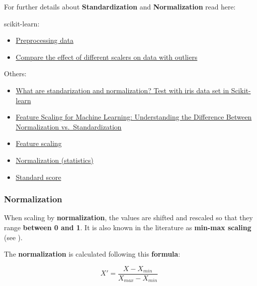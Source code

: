 \documentclass [oneside,10pt,a4paper,ngerman,BCOR10mm,headsepline,parindent,final]{scrartcl}
\providecommand{\tightlist}{%
      \setlength{\itemsep}{0pt}\setlength{\parskip}{0pt}}
\begin{document}
For further details about \textbf{Standardization} and
\textbf{Normalization} read here:

scikit-learn:

\begin{itemize}
\tightlist
\item
  \href{https://scikit-learn.org/stable/modules/preprocessing.html}{Preprocessing
  data}
\item
  \href{https://scikit-learn.org/stable/auto_examples/preprocessing/plot_all_scaling.html\#sphx-glr-auto-examples-preprocessing-plot-all-scaling-py}{Compare
  the effect of different scalers on data with outliers}
\end{itemize}

Others:

\begin{itemize}
\tightlist
\item
  \href{http://techflare.blog/what-are-standarization-and-normalization-test-with-iris-data-set-in-scikit-learn/}{What
  are standarization and normalization? Test with iris data set in
  Scikit-learn}
\item
  \href{https://www.analyticsvidhya.com/blog/2020/04/feature-scaling-machine-learning-normalization-standardization/?}{Feature
  Scaling for Machine Learning: Understanding the Difference Between
  Normalization vs.~Standardization}
\item
  \href{https://en.wikipedia.org/wiki/Feature_scaling}{Feature scaling}
\item
  \href{https://en.wikipedia.org/wiki/Normalization_(statistics)}{Normalization
  (statistics)}
\item
  \href{https://en.wikipedia.org/wiki/Standard_score}{Standard score}
\end{itemize}

    \hypertarget{normalization}{%
\subsubsection{Normalization}\label{normalization}}

When scaling by \textbf{normalization}, the values are shifted and
rescaled so that they range \textbf{between 0 and 1}. It is also known
in the literature as \textbf{min-max scaling} (see
\cite{feature_scaling_2020}).

The \textbf{normalization} is calculated following this
\textbf{formula}:

\[X' = \frac{X - X_{min}}{X_{max} - X_{min}}\]
\end{document}
